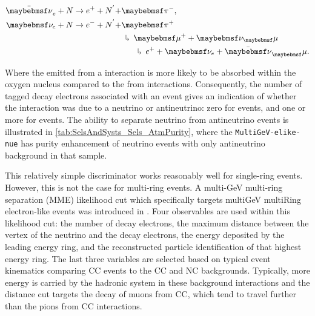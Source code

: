 \begin{align}
  \begin{split}
    \bar{\nu}_e + N \rightarrow e^{+} + N^{'} + &\pi^{-}, \\
    \nu_e + N \rightarrow e^{-} + N^{'} + &\pi^{+} \\
    &\hspace{5pt} \rotatebox[origin=c]{180}{$\Lsh$} \hspace{5pt} \mu^{+} + \nu_\mu \\
    &\hspace{20pt} \rotatebox[origin=c]{180}{$\Lsh$} \hspace{5pt} e^{+} + \nu_e + \bar{\nu}_\mu.
\end{split}
\end{align}

Where the \quickmath{\pi^{-}} emitted from a  interaction is more likely to be absorbed within the oxygen nucleus \cite{LeeKaPik} compared to the \quickmath{\pi^{+}} from  interactions. Consequently, the number of tagged decay electrons associated with an event gives an indication of whether the interaction was due to a neutrino or antineutrino: zero for  events, and one or more for  events. The ability to separate neutrino from antineutrino events is illustrated in \autoref{tab:SelsAndSysts_Sels_AtmPurity}, where the \texttt{MultiGeV-elike-nue} has  purity enhancement of neutrino events with only  antineutrino background in that sample.

This relatively simple discriminator works reasonably well for single-ring events. However, this is not the case for multi-ring events. A multi-GeV multi-ring separation (MME) likelihood cut which specifically targets multiGeV multiRing electron-like events was introduced in \cite{PhysRevD.81.092004, PhysRevD.74.032002}. Four observables are used within this likelihood cut: the number of decay electrons, the maximum distance between the vertex of the neutrino and the decay electrons, the energy deposited by the leading energy ring, and the reconstructed particle identification of that highest energy ring. The last three variables are selected based on typical event kinematics comparing CC events to the CC\quickmath{\nu_{\mu}} and NC backgrounds. Typically, more energy is carried by the hadronic system in these background interactions and the distance cut targets the decay of muons from CC\quickmath{\nu_{\mu}}, which tend to travel further than the pions from CC interactions.

